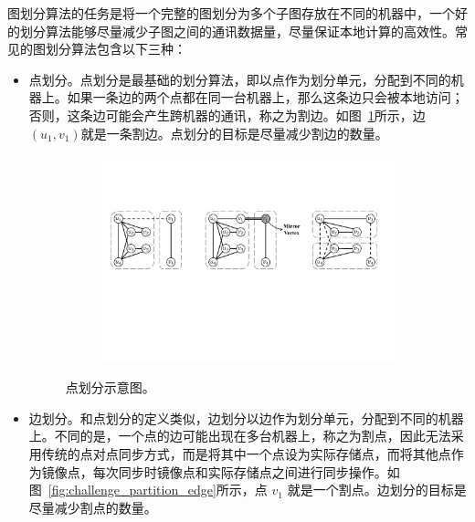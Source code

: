 图划分算法的任务是将一个完整的图划分为多个子图存放在不同的机器中，一个好的划分算法能够尽量减少子图之间的通讯数据量，尽量保证本地计算的高效性。常见的图划分算法包含以下三种：
\begin{itemize}
    \item 点划分。点划分是最基础的划分算法，即以点作为划分单元，分配到不同的机器上。如果一条边的两个点都在同一台机器上，那么这条边只会被本地访问；否则，这条边可能会产生跨机器的通讯，称之为割边。如图~\ref{fig:challenge_partition_vertex}所示，边$(u_1, v_1)$就是一条割边。点划分的目标是尽量减少割边的数量。
    
    \begin{figure}[h]
        \centering
            \begin{subfigure}{0.4\linewidth}
                \centering
                \includegraphics[width=0.8\linewidth]{figures/challenge_partition_a.pdf}
            \end{subfigure}
         \caption{点划分示意图。}
        \label{fig:challenge_partition_vertex}
    \end{figure}

    \item 边划分。和点划分的定义类似，边划分以边作为划分单元，分配到不同的机器上。不同的是，一个点的边可能出现在多台机器上，称之为割点，因此无法采用传统的点对点同步方式，而是将其中一个点设为实际存储点，而将其他点作为镜像点，每次同步时镜像点和实际存储点之间进行同步操作。如图~\ref{fig:challenge_partition_edge}所示，点 $v_1$ 就是一个割点。边划分的目标是尽量减少割点的数量。
    

\end{itemize}

